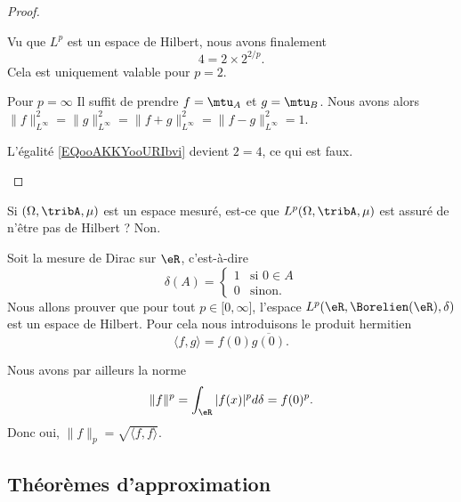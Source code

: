 \begin{proof}
\begin{subproof}
		Vu que \( L^p\) est un espace de Hilbert, nous avons finalement
		\begin{equation}
			4=2\times 2^{2/p}.
		\end{equation}
		Cela est uniquement valable pour \( p=2\).
		\item[Pour \( p=\infty\)]
		Il suffit de prendre \( f=\mtu_A\) et \( g=\mtu_B\). Nous avons alors \(  \| f \|_{L^{\infty}}^2= \| g \|_{L^{\infty}}^2  =  \| f+g \|_{L^{\infty}}^2=\| f-g \|_{L^{\infty}}^2=1\).

		L'égalité \eqref{EQooAKKYooURIbvi} devient \( 2=4\), ce qui est faux.
	\end{subproof}
\end{proof}

Si \( (\Omega,\tribA,\mu)\) est un espace mesuré, est-ce que \( L^p(\Omega,\tribA,\mu)\) est assuré de n'être pas de Hilbert ? Non.

\begin{example}
	Soit la mesure de Dirac sur \( \eR\), c'est-à-dire
	\begin{equation}
		\delta(A)=\begin{cases}
			1 & \text{si } 0\in A \\
			0 & \text{sinon. }
		\end{cases}
	\end{equation}
	Nous allons prouver que pour tout \( p\in \mathopen[ 0 , \infty \mathclose]\), l'espace \( L^p(\eR,\Borelien(\eR),\delta)\) est un espace de Hilbert. Pour cela nous introduisons le produit hermitien
	\begin{equation}
		\langle f, g\rangle =f(0)\overline{ g(0) }.
	\end{equation}

	Nous avons par ailleurs la norme
	\begin{equation}
		\| f \|^p=\int_{\eR}| f(x) |^pd\delta=f(0)^p.
	\end{equation}
	Donc oui, \( \| f \|_p=\sqrt{ \langle f, f\rangle  }\).
\end{example}

\subsection{Théorèmes d'approximation}

